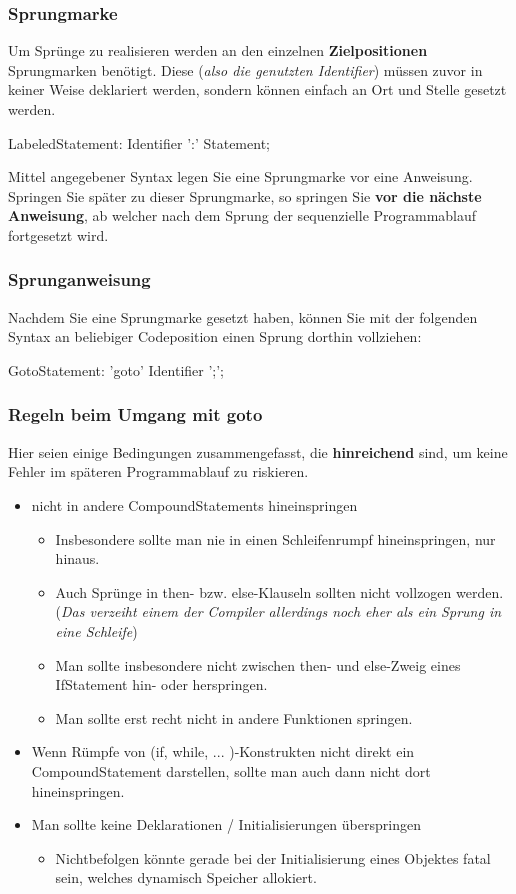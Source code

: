 \documentclass[a4paper]{report}
\begin{document}
\subsubsection{Sprungmarke}
Um Sprünge zu realisieren werden an den einzelnen \textbf{Zielpositionen} Sprungmarken benötigt. Diese (\textit{also die genutzten Identifier}) müssen zuvor in keiner Weise deklariert werden, sondern können einfach an Ort und Stelle gesetzt werden.
\begin{rail}
	LabeledStatement: Identifier ':' Statement;
\end{rail}
Mittel angegebener Syntax legen Sie eine Sprungmarke vor eine Anweisung. Springen Sie später zu dieser Sprungmarke, so springen Sie \textbf{vor die nächste Anweisung}, ab welcher nach dem Sprung der sequenzielle Programmablauf fortgesetzt wird.
\subsubsection{Sprunganweisung}
Nachdem Sie eine Sprungmarke gesetzt haben, können Sie mit der folgenden Syntax an beliebiger Codeposition einen Sprung dorthin vollziehen:
\begin{rail}
	GotoStatement: 'goto' Identifier ';';
\end{rail}

\subsubsection{Regeln beim Umgang mit goto}
Hier seien einige Bedingungen zusammengefasst, die \textbf{hinreichend} sind, um keine Fehler im späteren Programmablauf zu riskieren.
\begin{itemize}
	\item nicht in andere CompoundStatements hineinspringen
	\begin{itemize}
		\item  Insbesondere sollte man nie in einen Schleifenrumpf hineinspringen, nur hinaus.
		\item  Auch Sprünge in then- bzw. else-Klauseln sollten nicht vollzogen werden. (\textit{Das verzeiht einem der Compiler allerdings noch eher als ein Sprung in eine Schleife})
		\item  Man sollte insbesondere nicht zwischen then- und else-Zweig eines IfStatement hin- oder herspringen.
		\item  Man sollte erst recht nicht in andere Funktionen springen.
	\end{itemize}
	\item Wenn Rümpfe von (if, while, ... )-Konstrukten nicht direkt ein CompoundStatement darstellen, sollte man auch dann nicht dort hineinspringen.
	\item Man sollte keine Deklarationen / Initialisierungen überspringen
	\begin{itemize}
		\item Nichtbefolgen könnte gerade bei der Initialisierung eines Objektes fatal sein, welches dynamisch Speicher allokiert.
	\end{itemize}
\end{itemize}
\end{document}
